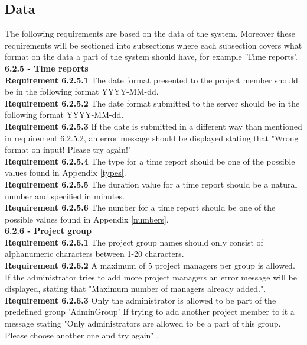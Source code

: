 \documentclass{article}
\begin{document}
\subsection{Data}
The following requirements are based on the data of the system. Moreover these requirements will be sectioned into subsections where each subsection covers what format on the data a part of the system should have, for example 'Time reports'. \\

{\fontsize{11}{11}\selectfont \noindent\textbf{6.2.5 - Time reports}} \\
\textbf{Requirement 6.2.5.1} The date format presented to the project member should be in the following format YYYY-MM-dd. \\
\textbf{Requirement 6.2.5.2} The date format submitted to the server should be in the following format YYYY-MM-dd. \\
\textbf{Requirement 6.2.5.3} %
If the date is submitted in a different way than mentioned in requirement 6.2.5.2, an error message should be displayed stating that "Wrong format on input! Please try again!"  \\
\textbf{Requirement 6.2.5.4} The type for a time report should be one of the possible values found in Appendix \ref{types}. \\
\textbf{Requirement 6.2.5.5} The duration value for a time report should be a natural number and specified in minutes. \\
\textbf{Requirement 6.2.5.6} The number for a time report should be one of the possible values found in Appendix \ref{numbers}. \\

{\fontsize{11}{11}\selectfont \noindent\textbf{6.2.6 - Project group}} \\
\textbf{Requirement 6.2.6.1} The project group names should only consist of alphanumeric characters between 1-20 characters. \\
\textbf{Requirement 6.2.6.2} A maximum of 5 project managers per group is allowed. If the administrator tries to add more project managers an error message will be displayed, stating that "Maximum number of managers already added.". \\
\textbf{Requirement 6.2.6.3} Only the administrator is allowed to be part of the predefined group 'AdminGroup' If trying to add another project member to it a message stating "Only administrators are allowed to be a part of this group. Please choose another one and try again" .\\
\end{document}
